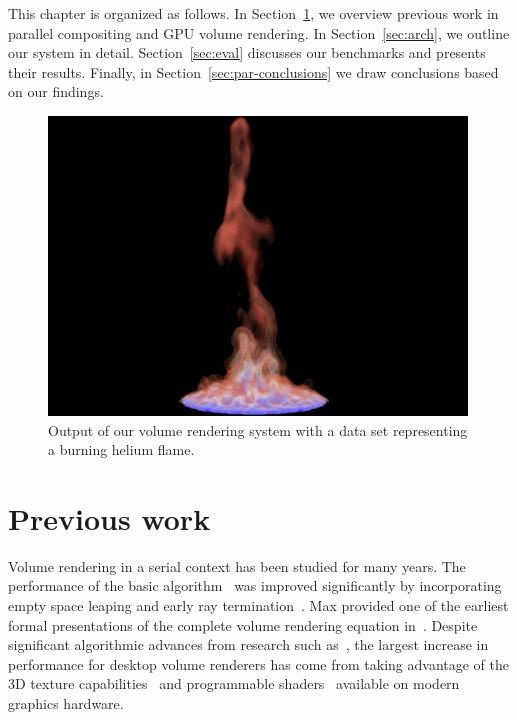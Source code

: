 This chapter is organized as follows.  In Section~\ref{sec:previous},
we overview previous work in parallel compositing and GPU volume
rendering.  In Section~\ref{sec:arch}, we outline our system in detail.
Section~\ref{sec:eval} discusses our benchmarks and presents their
results. Finally, in Section~\ref{sec:par-conclusions} we draw conclusions
based on our findings.

\begin{figure}
  \includegraphics[width=\linewidth]{images/multiscale/teaser}
  \caption{Output of our volume rendering system with a data set
  representing a burning helium flame.}
  \label{fig:sample}
\end{figure}

\section{Previous work}
\label{sec:previous}

Volume rendering in a serial context has been studied for many years.
The
performance of the basic algorithm~\cite{Drebin:1988:VolRen} was
improved significantly by incorporating empty space leaping and early
ray
termination~\cite{Levoy:EarlyTermination}.  Max provided one of the
earliest formal presentations of the complete volume rendering equation
in~\cite{Max:1995:OpticalModels}.  Despite significant algorithmic
advances from
research such as~\cite{Levoy:EarlyTermination}, the largest increase in
performance for desktop volume renderers has come from taking advantage
of the 3D texture capabilities~\cite{Cabral:1994:AVRA,
Cullip:1993:AVRW, Westermann:1998:VolRen} and
programmable shaders~\cite{Krueger:2003:ATGV} available on modern
graphics hardware.


